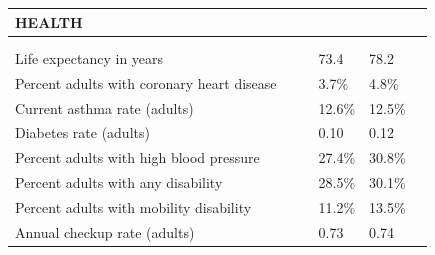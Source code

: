 \documentclass[9pt]{report}
\begin{document}
\newpage
\setlength{\tabcolsep}{.01in} %
\begin{tabular}{p{.10in}p{.10in}p{.10in}p{3.7in}>{\hfill}p{.85in}>{\hfill}p{.85in}>{\hfill}p{.85in}>{\hfill}p{.85in}p{0.1in}}
\multicolumn{9}{l}{\parbox{7.1in}{\raggedright{\large{\strut\textbf{HEALTH}\strut}}}} \\ 
\hline
\multicolumn{4}{l}{\parbox{3.5in}{\raggedright{\textbf{}}}} & \multicolumn{1}{r}{\parbox{.85in}{\strut\raggedleft{\textbf{}\strut}}} & \multicolumn{1}{r}{\parbox{.85in}{\strut\raggedleft{\textbf{}\strut}}} & \multicolumn{1}{r}{\parbox{.85in}{\strut{}}} & \multicolumn{1}{r}{\parbox{.85in}{\strut{}}} & \\ 
\multicolumn{9}{l}{} \\ 
\multicolumn{4}{l}{\parbox{3.6in}{\strut\raggedright{{Life expectancy in years}}\strut}} &  &  & 73.4 & 78.2 & \multicolumn{1}{l}{}  \\ 
\multicolumn{4}{l}{\parbox{3.6in}{\strut\raggedright{{Percent adults with coronary heart disease}}\strut}} &  &  & 3.7\% & 4.8\% & \multicolumn{1}{l}{}  \\ 
\multicolumn{4}{l}{\parbox{3.6in}{\strut\raggedright{{Current asthma rate (adults)}}\strut}} &  &  & 12.6\% & 12.5\% & \multicolumn{1}{l}{}  \\ 
\multicolumn{4}{l}{\parbox{3.6in}{\strut\raggedright{{Diabetes rate (adults)}}\strut}} &  &  & 0.10 & 0.12 & \multicolumn{1}{l}{}  \\ 
\multicolumn{4}{l}{\parbox{3.6in}{\strut\raggedright{{Percent adults with high blood pressure}}\strut}} &  &  & 27.4\% & 30.8\% & \multicolumn{1}{l}{}  \\ 
\multicolumn{4}{l}{\parbox{3.6in}{\strut\raggedright{{Percent adults with any disability}}\strut}} &  &  & 28.5\% & 30.1\% & \multicolumn{1}{l}{}  \\ 
\multicolumn{4}{l}{\parbox{3.6in}{\strut\raggedright{{Percent adults with mobility disability}}\strut}} &  &  & 11.2\% & 13.5\% & \multicolumn{1}{l}{}  \\ 
\multicolumn{4}{l}{\parbox{3.6in}{\strut\raggedright{{Annual checkup rate (adults)}}\strut}} &  &  & 0.73 & 0.74 & \multicolumn{1}{l}{}  \\ 

\end{tabular}
\end{document}
